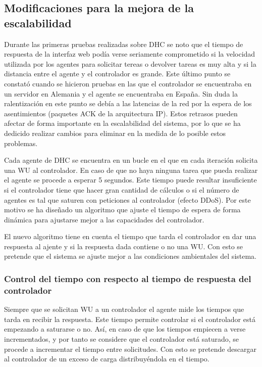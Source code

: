 \subsection{Modificaciones para la mejora de la escalabilidad}

Durante las primeras pruebas realizadas sobre DHC se noto que el tiempo de respuesta de la interfaz web podía verse seriamente comprometido si la velocidad utilizada por los agentes para solicitar tereas o devolver tareas es muy alta y si la distancia entre el agente y el controlador es grande. Este último punto se constató cuando se hicieron pruebas en las que el controlador se encuentraba en un servidor en Alemania y el agente se encuentraba en España. Sin duda la ralentización en este punto se debía a las latencias de la red por la espera de los asentimientos (paquetes ACK de la arquitectura IP). Estos retrasos pueden afectar de forma importante en la escalabilidad del sistema, por lo que se ha dedicido realizar cambios para eliminar en la medida de lo posible estos problemas.

Cada agente de DHC se encuentra en un bucle en el que en cada iteración solicita una WU al controlador. En caso de que no haya ninguna tarea que pueda realizar el agente se procede a esperar 5 segundos. Este tiempo puede resultar insuficiente si el controlador tiene que hacer gran cantidad de cálculos o si el número de agentes es tal que saturen con peticiones al controlador (efecto DDoS). Por este motivo se ha diseñado un algoritmo que ajuste el tiempo de espera de forma dinámica para ajustarse mejor a las capacidades del controlador.

El nuevo algoritmo tiene en cuenta el tiempo que tarda el controlador en dar una respuesta al ajente y si la respuesta dada contiene o no una WU. Con esto se pretende que el sistema se ajuste mejor a las condiciones ambientales del sistema.

\subsubsection{Control del tiempo con respecto al tiempo de respuesta del controlador}

Siempre que se solicitan WU a un controlador el agente mide los tiempos que tarda en recibir la respuesta. Este tiempo permite controlar si el controlador está empezando a saturarse o no. Así, en caso de que los tiempos empiecen a verse incrementados, y por tanto se considere que el controlador está saturado, se procede a incrementar el tiempo entre solicitudes. Con esto se pretende descargar al controlador de un exceso de carga distribuyéndola en el tiempo.

